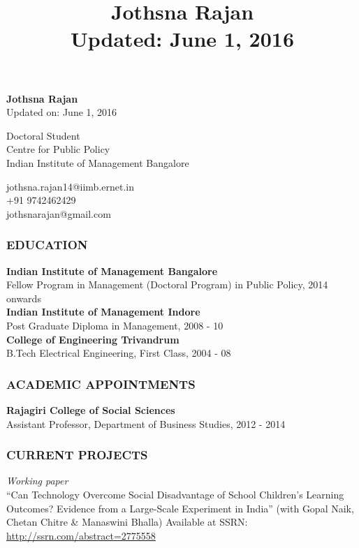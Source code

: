 \documentclass[12pt, a4paper]{article}
\title{\textbf{Jothsna Rajan \\ \small{Updated: June 1, 2016} }}
\date{}
\begin{document}
	\begin{center}
		\large{\textbf{Jothsna Rajan}} \\
		\small{Updated on: June 1, 2016}
	\end{center}
	\begin{multicols}{2}
		\begin{flushleft}
			\noindent Doctoral Student \\
			Centre for Public Policy \\
			Indian Institute of Management Bangalore \\
		\end{flushleft}
		\begin{flushright}
			\noindent jothsna.rajan14@iimb.ernet.in \\
			+91 9742462429 \\
			jothsnarajan@gmail.com \\
		\end{flushright}
	\end{multicols}
	\subsubsection*{EDUCATION}
	
	\noindent\textbf{Indian Institute of Management Bangalore} \\
	Fellow Program in Management (Doctoral Program) in Public Policy, 2014 onwards \\
	
	\noindent\textbf{Indian Institute of Management Indore} \\
	Post Graduate Diploma in Management, 2008 - 10 \\
	
	\noindent\textbf{College of Engineering Trivandrum} \\
	B.Tech Electrical Engineering, First Class, 2004 - 08
	
	\subsubsection*{ACADEMIC APPOINTMENTS}
		\noindent\textbf{Rajagiri College of Social Sciences} \\
		Assistant Professor, Department of Business Studies, 2012 - 2014 
	\subsubsection*{CURRENT PROJECTS}
		\noindent \textit{Working paper} \\
		``Can Technology Overcome Social Disadvantage of School Children's Learning Outcomes? Evidence from a Large-Scale Experiment in India'' (with Gopal Naik, Chetan Chitre \& Manaswini Bhalla) Available at SSRN: \url{http://ssrn.com/abstract=2775558} 
\end{document}
